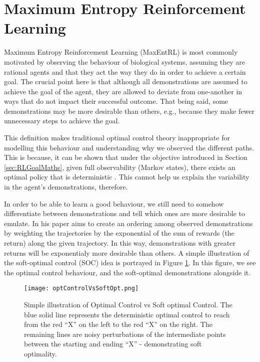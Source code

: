 \documentclass{report}
\numberwithin{equation}{section}
\numberwithin{figure}{section}
\numberwithin{table}{section}
\numberwithin{algorithm}{section}
\begin{document}
\section{Maximum Entropy Reinforcement Learning}\label{sec:MaxEntRL}
Maximum Entropy Reinforcement Learning (MaxEntRL) is most commonly 
motivated by observing the behaviour of biological systems, assuming 
they are rational agents and that they act the way they do in order to achieve 
a certain goal. The crucial point here is that although all 
demonstrations are assumed to achieve the goal of the agent, 
they are allowed to deviate from one-another in ways that 
do not impact their successful outcome. That being said, 
some demonstrations may be more desirable than others, e.g., 
because they make fewer unnecessary steps to achieve the goal.

This definition makes 
traditional optimal control theory inappropriate for modelling 
this behaviour and understanding why we observed the different 
paths. This is because, it can be shown that under the objective 
introduced in Section \ref{sec:RLGoalMaths}, given full observability 
(Markov states), there exists an optimal policy that 
is deterministic \citep{Sutton1998}.
This cannot help us explain the variability in the agent's demonstrations,
therefore.

In order to be able to learn a good behaviour, we still 
need to somehow differentiate between demonstrations and tell 
which ones are more desirable to emulate. 
In his paper \cite{Ziebart2008} aims to create an ordering among 
observed demonstrations by weighting the trajectories 
by the exponential of the sum of rewards (the return) along 
the given trajectory. In this way, demonstrations with greater 
returns 
will be exponentialy more desirable than others. A simple illustration 
of the soft-optimal control (SOC) idea is portrayed in Figure \ref{fig:softopt}. 
In this figure, we see the optimal control behaviour, and the 
soft-optimal demonstrations alongside it.


\begin{figure}[H]
  \begin{center}
    \texttt{[image: optControlVsSoftOpt.png]}
  \end{center}
  \caption{\label{fig:softopt}Simple illustration of Optimal Control vs Soft optimal 
  Control. The blue solid line represents the deterministic optimal 
  control to reach from the red ``X'' on the left to the 
  red ``X'' on the right. The remaining lines 
  are noisy perturbations of the intermediate points 
  between the starting and ending ``X'' - demonstrating 
  soft optimality.}
\end{figure}
\end{document}
